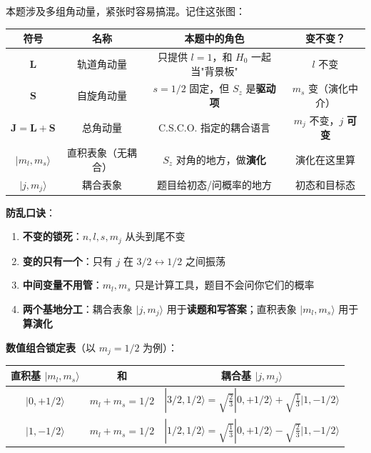 \begin{cheatbox}
本题涉及多组角动量，紧张时容易搞混。记住这张图：

\begin{center}
\renewcommand{\arraystretch}{1.4}
\begin{tabular}{|c|c|c|c|}
\hline
\textbf{符号} & \textbf{名称} & \textbf{本题中的角色} & \textbf{变不变？} \\
\hline
$\bm{L}$ & 轨道角动量 & 只提供 $l=1$，和 $H_0$ 一起当"背景板" & $l$ 不变 \\
\hline
$\bm{S}$ & 自旋角动量 & $s=1/2$ 固定，但 $S_z$ 是\textbf{驱动项} & $m_s$ 变（演化中介） \\
\hline
$\bm{J}=\bm{L}+\bm{S}$ & 总角动量 & C.S.C.O. 指定的耦合语言 & $m_j$ 不变，$j$ \textbf{可变} \\
\hline
$|m_l, m_s\rangle$ & 直积表象（无耦合） & $S_z$ 对角的地方，做\textbf{演化} & 演化在这里算 \\
\hline
$|j, m_j\rangle$ & 耦合表象 & 题目给初态/问概率的地方 & 初态和目标态 \\
\hline
\end{tabular}
\end{center}

\textbf{防乱口诀}：
\begin{enumerate}[nosep]
    \item \textbf{不变的锁死}：$n, l, s, m_j$ 从头到尾不变
    \item \textbf{变的只有一个}：只有 $j$ 在 $3/2 \leftrightarrow 1/2$ 之间振荡
    \item \textbf{中间变量不用管}：$m_l, m_s$ 只是计算工具，题目不会问你它们的概率
    \item \textbf{两个基地分工}：耦合表象 $|j,m_j\rangle$ 用于\textbf{读题和写答案}；直积表象 $|m_l,m_s\rangle$ 用于\textbf{算演化}
\end{enumerate}

\vspace{6pt}
\textbf{数值组合锁定表}（以 $m_j=1/2$ 为例）：

\begin{center}
\renewcommand{\arraystretch}{1.5}
\begin{tabular}{|c|c|c|}
\hline
\textbf{直积基 $|m_l, m_s\rangle$} & \textbf{和} & \textbf{耦合基 $|j, m_j\rangle$} \\
\hline
$|0, +1/2\rangle$ & $m_l+m_s = 1/2$ & $\displaystyle |3/2, 1/2\rangle = \sqrt{\frac{2}{3}}|0,+1/2\rangle + \sqrt{\frac{1}{3}}|1,-1/2\rangle$ \\
$|1, -1/2\rangle$ & $m_l+m_s = 1/2$ & $\displaystyle |1/2, 1/2\rangle = \sqrt{\frac{1}{3}}|0,+1/2\rangle - \sqrt{\frac{2}{3}}|1,-1/2\rangle$ \\
\hline
\end{tabular}
\end{center}


\end{cheatbox}
